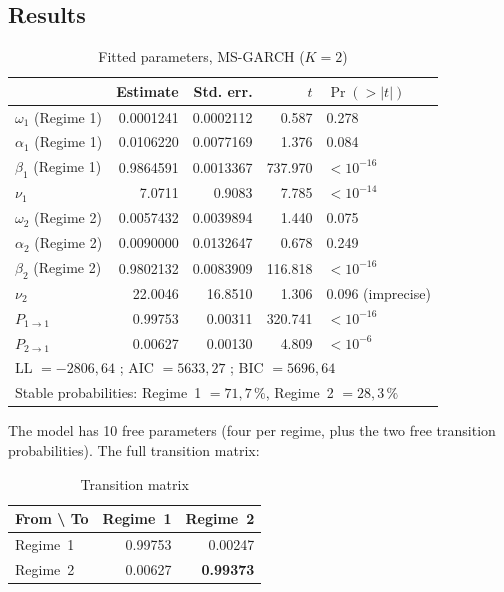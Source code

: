 \documentclass[12pt,a4paper]{article}
\begin{document}
\subsection{Results}

\begin{table}[H]
	\centering
	\small
	\caption{Fitted parameters, MS-GARCH ($K=2$)}
	\begin{tabular}{lrrrl}
		\toprule
		& Estimate & Std. err. & $t$ & $\Pr(>|t|)$ \\
		\midrule
		$\omega_1$ (Regime 1) & 0.0001241 & 0.0002112 & 0.587 & 0.278 \\
		$\alpha_1$ (Regime 1) & 0.0106220 & 0.0077169 & 1.376 & 0.084 \\
		$\beta_1$ (Regime 1) & 0.9864591 & 0.0013367 & 737.970 & $<10^{-16}$ \\
		$\nu_1$ & 7.0711 & 0.9083 & 7.785 & $<10^{-14}$ \\
		$\omega_2$ (Regime 2) & 0.0057432 & 0.0039894 & 1.440 & 0.075 \\
		$\alpha_2$ (Regime 2) & 0.0090000 & 0.0132647 & 0.678 & 0.249 \\
		$\beta_2$ (Regime 2) & 0.9802132 & 0.0083909 & 116.818 & $<10^{-16}$ \\
		$\nu_2$ & 22.0046 & 16.8510 & 1.306 & 0.096 (imprecise) \\
		$P_{1\to1}$ & 0.99753 & 0.00311 & 320.741 & $<10^{-16}$ \\
		$P_{2\to1}$ & 0.00627 & 0.00130 & 4.809 & $<10^{-6}$ \\
		\midrule
		\multicolumn{5}{l}{LL $=-2806{,}64$ ; AIC $=5633{,}27$ ; BIC $=5696{,}64$} \\
		\multicolumn{5}{l}{Stable probabilities: Regime~1 $=71{,}7\,\%$, Regime~2 $=28{,}3\,\%$} \\
		\bottomrule
	\end{tabular}
\end{table}

The model has 10 free parameters (four per regime, plus the two
free transition probabilities). The full transition matrix:

\vspace{0.3cm}

\begin{table}[H]
	\centering
	\caption{Transition matrix}
	\begin{tabular}{lrr}
		\toprule
		From \textbackslash{} To & Regime~1 & Regime~2 \\
		\midrule
		Regime~1 & 0.99753 & 0.00247 \\
		Regime~2 & 0.00627 & \textbf{0.99373} \\
		\bottomrule
	\end{tabular}
\end{table}
\end{document}

